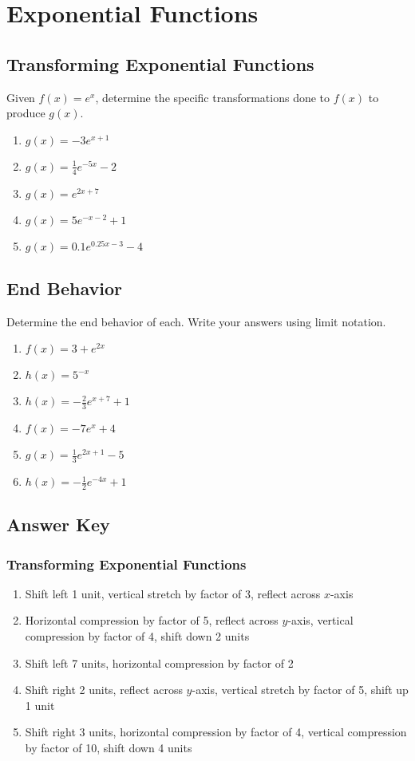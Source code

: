 \chapter{Exponential Functions}
\everymath{\displaystyle}

\section{Transforming Exponential Functions}

Given $f(x) = e^x$, determine the specific transformations done to $f(x)$ to produce $g(x)$.
\begin{enumerate}
	\item $g(x) = -3e^{x+1}$
	\item $g(x) = \frac{1}{4}e^{-5x} - 2$
	\item $g(x) = e^{2x+7}$
	\item $g(x) = 5e^{-x-2} + 1$
	\item $g(x) = 0.1e^{0.25x-3} - 4$
\end{enumerate}	

\section{End Behavior}

Determine the end behavior of each. Write your answers using limit notation.
\begin{enumerate}
	\item $f(x) = 3 + e^{2x}$
	\item $h(x) = 5^{-x}$
	\item $h(x) = -\frac{2}{3}e^{x+7} + 1$
	\item $f(x) = -7e^x + 4$
	\item $g(x) = \frac{1}{3}e^{2x+1}-5$
	\item $h(x) = -\frac{1}{2}e^{-4x} + 1$
\end{enumerate}

\newpage

\section{Answer Key}

\subsection*{Transforming Exponential Functions}

\begin{enumerate}
	\item Shift left 1 unit, vertical stretch by factor of 3, reflect across $x$-axis
	\item Horizontal compression by factor of 5, reflect across $y$-axis, vertical compression by factor of 4, shift down 2 units
	\item Shift left 7 units, horizontal compression by factor of 2
	\item Shift right 2 units, reflect across $y$-axis, vertical stretch by factor of 5, shift up 1 unit
	\item Shift right 3 units, horizontal compression by factor of 4, vertical compression by factor of 10, shift down 4 units
\end{enumerate}

